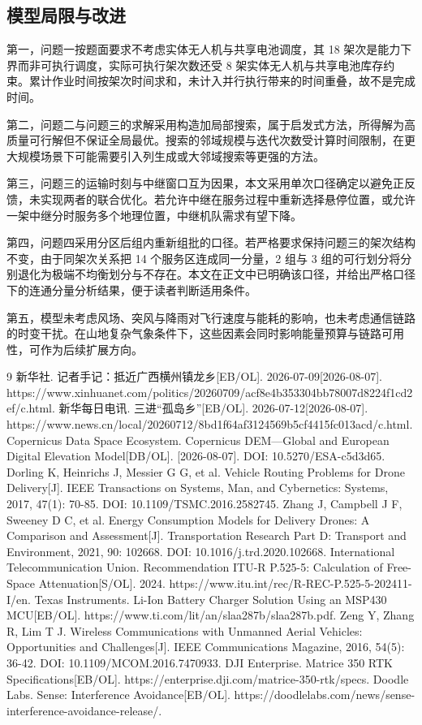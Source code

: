 \documentclass[bwprint]{gmcmthesis}
\begin{document}
\subsection{模型局限与改进}
第一，问题一按题面要求不考虑实体无人机与共享电池调度，其 18 架次是能力下界而非可执行调度，实际可执行架次数还受 8 架实体无人机与共享电池库存约束。累计作业时间按架次时间求和，未计入并行执行带来的时间重叠，故不是完成时间。

第二，问题二与问题三的求解采用构造加局部搜索，属于启发式方法，所得解为高质量可行解但不保证全局最优。搜索的邻域规模与迭代次数受计算时间限制，在更大规模场景下可能需要引入列生成或大邻域搜索等更强的方法。

第三，问题三的运输时刻与中继窗口互为因果，本文采用单次口径确定以避免正反馈，未实现两者的联合优化。若允许中继在服务过程中重新选择悬停位置，或允许一架中继分时服务多个地理位置，中继机队需求有望下降。

第四，问题四采用分区后组内重新组批的口径。若严格要求保持问题三的架次结构不变，由于同架次关系把 14 个服务区连成同一分量，2 组与 3 组的可行划分将分别退化为极端不均衡划分与不存在。本文在正文中已明确该口径，并给出严格口径下的连通分量分析结果，便于读者判断适用条件。

第五，模型未考虑风场、突风与降雨对飞行速度与能耗的影响，也未考虑通信链路的时变干扰。在山地复杂气象条件下，这些因素会同时影响能量预算与链路可用性，可作为后续扩展方向。

\begin{thebibliography}{9}
 新华社. 记者手记：抵近广西横州镇龙乡[EB/OL]. 2026-07-09[2026-08-07]. https://www.xinhuanet.com/politics/20260709/acf8e4b353304bb78007d8224f1cd2ef/c.html.
 新华每日电讯. 三进“孤岛乡”[EB/OL]. 2026-07-12[2026-08-07]. https://www.news.cn/local/20260712/8bd1f64af3124569b5cf4415fc013acd/c.html.
 Copernicus Data Space Ecosystem. Copernicus DEM—Global and European Digital Elevation Model[DB/OL]. [2026-08-07]. DOI: 10.5270/ESA-c5d3d65.
 Dorling K, Heinrichs J, Messier G G, et al. Vehicle Routing Problems for Drone Delivery[J]. IEEE Transactions on Systems, Man, and Cybernetics: Systems, 2017, 47(1): 70-85. DOI: 10.1109/TSMC.2016.2582745.
 Zhang J, Campbell J F, Sweeney D C, et al. Energy Consumption Models for Delivery Drones: A Comparison and Assessment[J]. Transportation Research Part D: Transport and Environment, 2021, 90: 102668. DOI: 10.1016/j.trd.2020.102668.
 International Telecommunication Union. Recommendation ITU-R P.525-5: Calculation of Free-Space Attenuation[S/OL]. 2024. https://www.itu.int/rec/R-REC-P.525-5-202411-I/en.
 Texas Instruments. Li-Ion Battery Charger Solution Using an MSP430 MCU[EB/OL]. https://www.ti.com/lit/an/slaa287b/slaa287b.pdf.
 Zeng Y, Zhang R, Lim T J. Wireless Communications with Unmanned Aerial Vehicles: Opportunities and Challenges[J]. IEEE Communications Magazine, 2016, 54(5): 36-42. DOI: 10.1109/MCOM.2016.7470933.
 DJI Enterprise. Matrice 350 RTK Specifications[EB/OL]. https://enterprise.dji.com/matrice-350-rtk/specs.
 Doodle Labs. Sense: Interference Avoidance[EB/OL]. https://doodlelabs.com/news/sense-interference-avoidance-release/.
\end{thebibliography}
\label{body:end}
\end{document}
